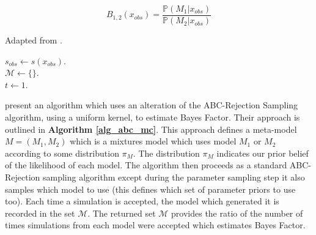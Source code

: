\documentclass[11pt,a4paper]{article}
\newcommand*{\prob}{\mathbb{P}}
\theoremstyle{break}
\begin{document}
  \[ B_{1,2}(x_{obs})=\frac{\prob(M_1|x_{obs})}{\prob(M_2|x_{obs})} \]

  \begin{box_algorithm}\label{alg_abc_mc}
    Adapted from \cite[]{abc_likelihood_free_methods_for_model_choice_in_gibbs_random_fields}.
    \begin{algorithm}[H]
      $s_{obs}\leftarrow s(x_{obs})$.\\
      $\mathcal{M}\leftarrow\{\}$.\\
      $t\leftarrow1$.\\
    \end{algorithm}
  \end{box_algorithm}

  \par \cite[]{abc_likelihood_free_methods_for_model_choice_in_gibbs_random_fields} present an algorithm which uses an alteration of the ABC-Rejection Sampling algorithm, using a uniform kernel, to estimate Bayes Factor. Their approach is outlined in \textbf{Algorithm \ref{alg_abc_mc}}. This approach defines a meta-model $M=(M_1,M_2)$ which is a mixtures model which uses model $M_1$ or $M_2$ according to some distribution $\pi_M$. The distribution $\pi_M$ indicates our prior belief of the likelihood of each model. The algorithm then proceeds as a standard ABC-Rejection sampling algorithm except during the parameter sampling step it also samples which model to use (this defines which set of parameter priors to use too). Each time a simulation is accepted, the model which generated it is recorded in the set $\mathcal{M}$. The returned set $\mathcal{M}$ provides the ratio of the number of times simulations from each model were accepted which estimates Bayes Factor.
\end{document}
